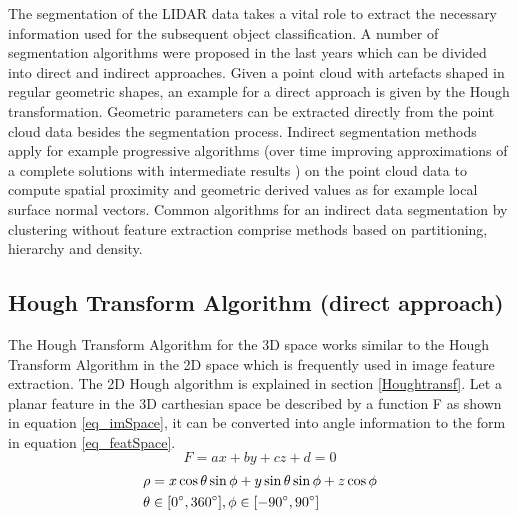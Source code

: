    
   The segmentation of the \ac{LIDAR} data takes a vital role to extract the necessary information used for the subsequent object classification.  A number of segmentation algorithms were proposed in the last years which can be divided into direct and indirect approaches. Given a point cloud with artefacts shaped in regular geometric shapes, an example for a direct
   approach is given by the Hough transformation. Geometric parameters can be extracted directly from the point cloud data besides the segmentation process. Indirect segmentation methods apply for example progressive algorithms (over time improving approximations of a complete solutions with intermediate results \cite{ProgAlg}) on the point cloud data to compute spatial proximity and geometric derived values as for example local surface normal vectors. Common algorithms for an indirect data segmentation by clustering without feature extraction comprise methods based on partitioning, hierarchy and density. 
   
   \subsection{Hough Transform Algorithm (direct approach)} \label{Hough3d}
   The Hough Transform Algorithm for the 3D space works similar to the Hough Transform Algorithm in the 2D space which is frequently used in image feature extraction. The 2D Hough algorithm is explained in section \ref{Houghtransf}. Let a planar feature in the 3D carthesian space be described by a function F as shown in equation \ref{eq_imSpace}, it can be converted into angle information to the form in equation  \ref{eq_featSpace}.
   \begin{equation} 
   \label{eq_imSpace}
   F=ax+ by+ cz+ d= 0%
   \end{equation} 
  \begin{equation}
   \begin{aligned} 
   \label{eq_featSpace}
    &\rho= x\cos\theta\sin\phi+ y\sin\theta\sin\phi+ z\cos\phi \\
    & \theta \in [0\degree,360\degree], \phi \in [-90\degree,90\degree]
   \end{aligned}
   \end{equation}
   
